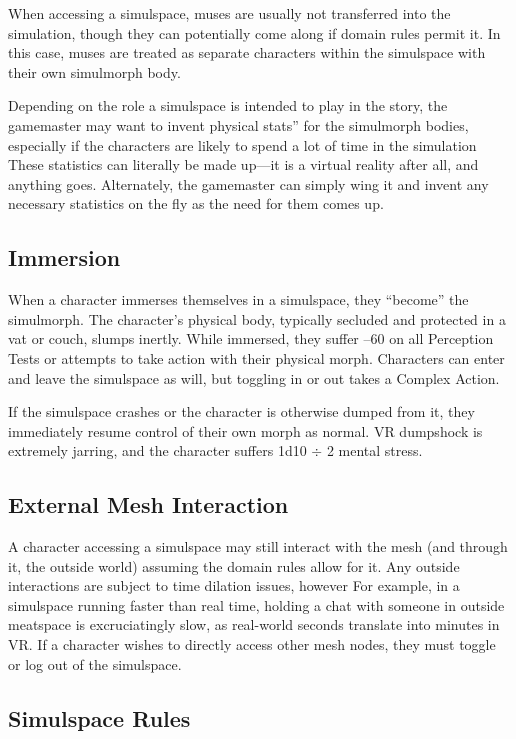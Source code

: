 When accessing a simulspace, muses are usually not 
transferred into the simulation, though they can potentially
come along if domain rules permit it. In this
case, muses are treated as separate characters within 
the simulspace with their own simulmorph body.

Depending on the role a simulspace is intended to play 
in the story, the gamemaster may want to invent physical
stats'' for the simulmorph bodies, especially if the
characters are likely to spend a lot of time in the simulation
These statistics can literally be made up—it is a virtual
reality after all, and anything goes. Alternately, the
gamemaster can simply wing it and invent any necessary 
statistics on the fly as the need for them comes up.

\subsection{Immersion}

When a character immerses themselves in a simulspace, 
they ``become'' the simulmorph. The character's physical
body, typically secluded and protected in a vat or
couch, slumps inertly. While immersed, they suffer –60 
on all Perception Tests or attempts to take action with 
their physical morph. Characters can enter and leave 
the simulspace as will, but toggling in or out takes a 
Complex Action.

If the simulspace crashes or the character is otherwise
dumped from it, they immediately resume control
of their own morph as normal. VR dumpshock is
extremely jarring, and the character suffers 1d10 $\div$ 2 
mental stress.

\subsection{External Mesh Interaction}

A character accessing a simulspace may still interact 
with the mesh (and through it, the outside world) 
assuming the domain rules allow for it. Any outside 
interactions are subject to time dilation issues, however
For example, in a simulspace running faster
than real time, holding a chat with someone in outside
meatspace is excruciatingly slow, as real-world
seconds translate into minutes in VR. If a character 
wishes to directly access other mesh nodes, they must 
toggle or log out of the simulspace.

\subsection{Simulspace Rules}

